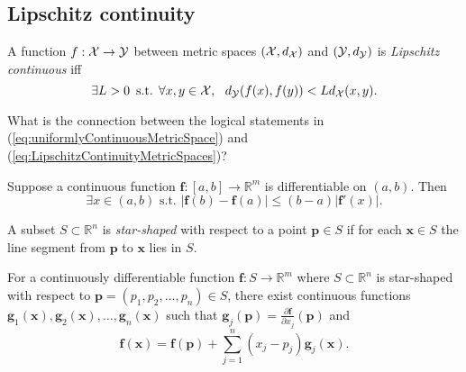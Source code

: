 \subsection{Lipschitz continuity}
\label{sec:lipschitz-continuity}

\begin{defn}
  \label{def:LipschitzContinuityMetricSpaces}
  A function $f: {\cal X} \rightarrow {\cal Y}$ between
  metric spaces $({\cal X},d_{\cal X})$ and $({\cal Y}, d_{\cal Y})$ 
  is \emph{Lipschitz continuous} iff
  \begin{equation}
    \label{eq:LipschitzContinuityMetricSpaces}
    \exists L>0\, \text{ s.t. }
     \forall x,y \in {\cal X}, \ \ 
    d_{\cal Y}(f(x),f(y)) < L d_{\cal X}(x,y). 
  \end{equation}
\end{defn}

\begin{exc}
  What is the connection between the logical statements
  in (\ref{eq:uniformlyContinuousMetricSpace})
  and (\ref{eq:LipschitzContinuityMetricSpaces})? 
\end{exc}

\begin{thm}
  \label{thm:vectorMeanValue}
  Suppose a continuous function $\mathbf{f}: [a,b]\rightarrow \mathbb{R}^m$
  is differentiable on $(a,b)$. Then 
  \begin{equation}
    \label{eq:vectorMeanValue}
    \exists x\in(a,b) \text{ s.t. }
    |\mathbf{f}(b)-\mathbf{f}(a)|\le (b-a)|\mathbf{f}'(x)|.
  \end{equation}
\end{thm}

\begin{defn}
  \label{def:starShapedSet}
  A subset $S\subset \mathbb{R}^n$ is \emph{star-shaped} with
  respect to a point $\mathbf{p}\in S$ if for each $\mathbf{x}\in S$
  the line segment from $\mathbf{p}$ to $\mathbf{x}$ lies in $S$.
\end{defn}

\begin{thm}
  \label{thm:meanValueVectorSimilar}
  For a continuously differentiable function
  $\mathbf{f}: S\rightarrow \mathbb{R}^m$
  where $S\subset \mathbb{R}^n$
  is star-shaped with respect to $\mathbf{p}=(p_1,p_2,\ldots,p_n)\in S$, 
  there exist continuous functions
  $\mathbf{g}_1(\mathbf{x}),
  \mathbf{g}_2(\mathbf{x}), \ldots, \mathbf{g}_n(\mathbf{x})$
  such that
  $\mathbf{g}_j(\mathbf{p}) = \frac{\partial \mathbf{f}}{\partial x_j}(\mathbf{p})$
  and 
  \begin{equation}
    \label{eq:meanValueVectorSimilar}
    \mathbf{f}(\mathbf{x}) = \mathbf{f}(\mathbf{p})
    + \sum_{j=1}^n(x_j-p_j) \mathbf{g}_j(\mathbf{x}). 
  \end{equation}
\end{thm}



